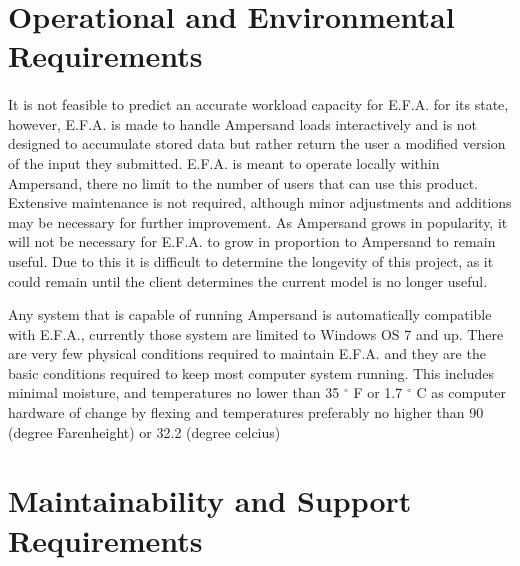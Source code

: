 \documentclass[12pt]{report}
\begin{document}
\section{Operational and Environmental Requirements}\label{sec:Operational}
\paragraph*{}
It is not feasible to predict an accurate workload capacity for E.F.A. for its state, however, 
E.F.A. is made to handle Ampersand loads interactively and is not designed to accumulate stored 
data but rather return the user a modified version of the input they submitted. E.F.A. is meant to 
operate locally within Ampersand, there no limit to the number of users that can use this product. 
Extensive maintenance is not required, although minor adjustments and additions may be necessary 
for further improvement. As Ampersand grows in popularity, it will not be necessary for E.F.A. to 
grow in proportion to Ampersand to remain useful. Due to this it is difficult to determine the 
longevity of this project, as it could remain until the client determines the current model is no 
longer useful. 

Any system that is capable of running Ampersand is automatically compatible with E.F.A., currently 
those system are limited to Windows OS 7 and up. There are very few physical conditions required to 
maintain E.F.A. and they are the basic conditions required to keep most computer system running. 
This includes minimal moisture, and temperatures no lower than 35 $^{\circ}$ F or 1.7 
$^{\circ}$ C 
as computer hardware of change by flexing 
 and 
temperatures preferably no higher than 90 (degree Farenheight) or 32.2 (degree celcius)

\section{Maintainability and Support Requirements}\label{sec:Support}
\end{document}
